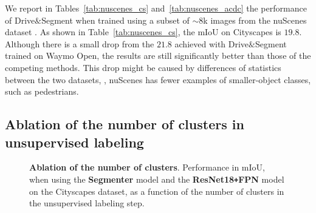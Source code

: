 \documentclass[runningheads]{llncs}
\newcommand{\ours}{Drive$\&$Segment\xspace}
\def\Plus{\texttt{+}}
\begin{document}
\endgroup 
We report in Tables~\ref{tab:nuscenes_cs} and~\ref{tab:nuscenes_acdc} the performance of \ours when trained 
using a subset of ${\sim}8$k images from the nuScenes dataset \cite{nuscenes}. 
As shown in Table~\ref{tab:nuscenes_cs}, 
the mIoU on Cityscapes is $19.8$.
Although there is a small drop from the $21.8$ achieved with \ours trained on Waymo Open, the results are still significantly better than those of the competing methods.
This drop might be caused by differences of statistics between the two datasets, \eg, nuScenes has fewer examples of smaller-object classes, such as pedestrians.



\subsection{Ablation of the number of clusters in unsupervised labeling}
\label{sec:clusters_number_ablation}


\begin{figure}[t]
        \centering



     \caption{        
    \textbf{Ablation of the number of clusters}. Performance in mIoU, when using the
        {\textcolor{RoyalPurple}{\textbf{Segmenter}}} model and the {\textcolor{BrickRed}{\textbf{ResNet18\Plus FPN}}} model on the Cityscapes dataset,  
        as a function of the number of clusters in the unsupervised labeling step.  
        }
    \label{fig:num_clusters_comparison}
\end{figure}
\end{document}
